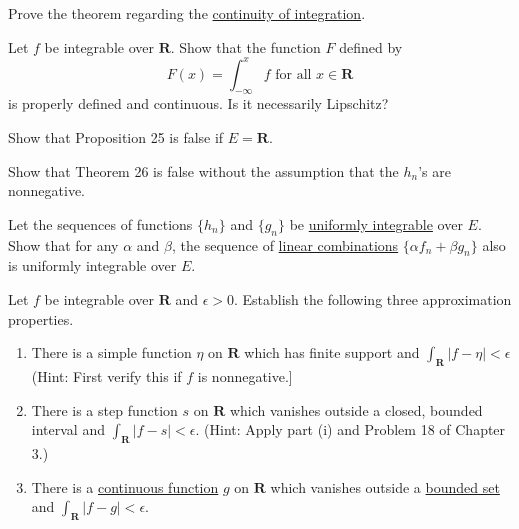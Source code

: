   \begin{exercise}[Royden 4.39]
    Prove the theorem regarding the \hyperref[thm:continuity-integration]{continuity of integration}.
  \end{exercise}

  \begin{exercise}[Royden 4.40]
    Let $f$ be integrable over $\mathbf{R}$. Show that the function $F$ defined by
    \begin{equation*}
      F(x) = \int_{-\infty}^x f \text{ for all } x \in \mathbf{R}
    \end{equation*}
    is properly defined and continuous. Is it necessarily Lipschitz?
  \end{exercise}

  \begin{exercise}[Royden 4.41]
    Show that Proposition 25 is false if $E = \mathbf{R}$.
  \end{exercise}

  \begin{exercise}[Royden 4.42]
    Show that Theorem 26 is false without the assumption that the $h_n$'s are nonnegative.
  \end{exercise}

  \begin{exercise}[Royden 4.43]
    Let the sequences of functions $\{h_n\}$ and $\{g_n\}$ be \hyperref[def:uniformly-integrable]{uniformly integrable} over $E$. Show that for any $\alpha$ and $\beta$, the sequence of \hyperref[lin-def:linear-combination]{linear combinations} $\{\alpha f_n + \beta g_n\}$ also is uniformly integrable over $E$.
  \end{exercise}

  \begin{exercise}[Royden 4.44]
    Let $f$ be integrable over $\mathbf{R}$ and $\epsilon > 0$. Establish the following three approximation properties.
    \begin{enumerate}
      \item There is a simple function $\eta$ on $\mathbf{R}$ which has finite support and $\int_{\mathbf{R}} |f - \eta| < \epsilon$ (Hint: First verify this if $f$ is nonnegative.]
      \item There is a step function $s$ on $\mathbf{R}$ which vanishes outside a closed, bounded interval and $\int_{\mathbf{R}} |f - s| < \epsilon$. (Hint: Apply part (i) and Problem 18 of Chapter 3.)
      \item There is a \hyperref[pst-def:continuous_func]{continuous function} $g$ on $\mathbf{R}$ which vanishes outside a \hyperref[pst-def:bounded-set]{bounded set} and $\int_{\mathbf{R}} |f - g| < \epsilon$.
    \end{enumerate}
  \end{exercise}

